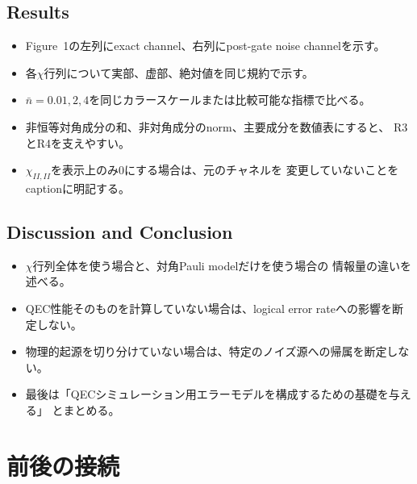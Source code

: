 \documentclass[dvipdfmx,a4paper,11pt]{jsarticle}
\begin{document}
\subsection{Results}

\begin{itemize}
  \item Figure~1の左列にexact channel、右列にpost-gate noise channelを示す。
  \item 各$\chi$行列について実部、虚部、絶対値を同じ規約で示す。
  \item $\bar{n}=0.01,2,4$を同じカラースケールまたは比較可能な指標で比べる。
  \item 非恒等対角成分の和、非対角成分のnorm、主要成分を数値表にすると、
        R3とR4を支えやすい。
  \item $\chi_{II,II}$を表示上のみ0にする場合は、元のチャネルを
        変更していないことをcaptionに明記する。
\end{itemize}

\subsection{Discussion and Conclusion}

\begin{itemize}
  \item $\chi$行列全体を使う場合と、対角Pauli modelだけを使う場合の
        情報量の違いを述べる。
  \item QEC性能そのものを計算していない場合は、logical error rateへの影響を断定しない。
  \item 物理的起源を切り分けていない場合は、特定のノイズ源への帰属を断定しない。
  \item 最後は「QECシミュレーション用エラーモデルを構成するための基礎を与える」
        とまとめる。
\end{itemize}

\section{前後の接続}
\end{document}
